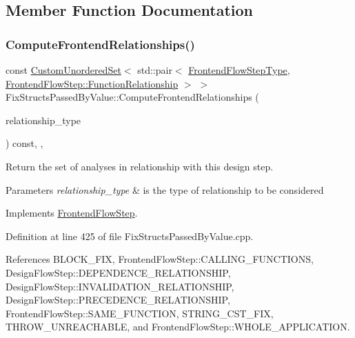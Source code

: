 \subsection{Member Function Documentation}
\mbox{\label{classFixStructsPassedByValue_a2c6b768192ecbd06442580abd9b162bc}} 
\subsubsection{\texorpdfstring{Compute\+Frontend\+Relationships()}{ComputeFrontendRelationships()}}
{\footnotesize\ttfamily const \hyperlink{classCustomUnorderedSet}{Custom\+Unordered\+Set}$<$ std\+::pair$<$ \hyperlink{frontend__flow__step_8hpp_afeb3716c693d2b2e4ed3e6d04c3b63bb}{Frontend\+Flow\+Step\+Type}, \hyperlink{classFrontendFlowStep_af7cf30f2023e5b99e637dc2058289ab0}{Frontend\+Flow\+Step\+::\+Function\+Relationship} $>$ $>$ Fix\+Structs\+Passed\+By\+Value\+::\+Compute\+Frontend\+Relationships (\begin{DoxyParamCaption}\item[{const \hyperlink{classDesignFlowStep_a723a3baf19ff2ceb77bc13e099d0b1b7}{Design\+Flow\+Step\+::\+Relationship\+Type}}]{relationship\+\_\+type }\end{DoxyParamCaption}) const\hspace{0.3cm}{\ttfamily [override]}, {\ttfamily [protected]}, {\ttfamily [virtual]}}



Return the set of analyses in relationship with this design step. 


\begin{DoxyParams}{Parameters}
{\em relationship\+\_\+type} & is the type of relationship to be considered \\
\hline
\end{DoxyParams}


Implements \hyperlink{classFrontendFlowStep_abeaff70b59734e462d347ed343dd700d}{Frontend\+Flow\+Step}.



Definition at line 425 of file Fix\+Structs\+Passed\+By\+Value.\+cpp.



References B\+L\+O\+C\+K\+\_\+\+F\+IX, Frontend\+Flow\+Step\+::\+C\+A\+L\+L\+I\+N\+G\+\_\+\+F\+U\+N\+C\+T\+I\+O\+NS, Design\+Flow\+Step\+::\+D\+E\+P\+E\+N\+D\+E\+N\+C\+E\+\_\+\+R\+E\+L\+A\+T\+I\+O\+N\+S\+H\+IP, Design\+Flow\+Step\+::\+I\+N\+V\+A\+L\+I\+D\+A\+T\+I\+O\+N\+\_\+\+R\+E\+L\+A\+T\+I\+O\+N\+S\+H\+IP, Design\+Flow\+Step\+::\+P\+R\+E\+C\+E\+D\+E\+N\+C\+E\+\_\+\+R\+E\+L\+A\+T\+I\+O\+N\+S\+H\+IP, Frontend\+Flow\+Step\+::\+S\+A\+M\+E\+\_\+\+F\+U\+N\+C\+T\+I\+ON, S\+T\+R\+I\+N\+G\+\_\+\+C\+S\+T\+\_\+\+F\+IX, T\+H\+R\+O\+W\+\_\+\+U\+N\+R\+E\+A\+C\+H\+A\+B\+LE, and Frontend\+Flow\+Step\+::\+W\+H\+O\+L\+E\+\_\+\+A\+P\+P\+L\+I\+C\+A\+T\+I\+ON.

